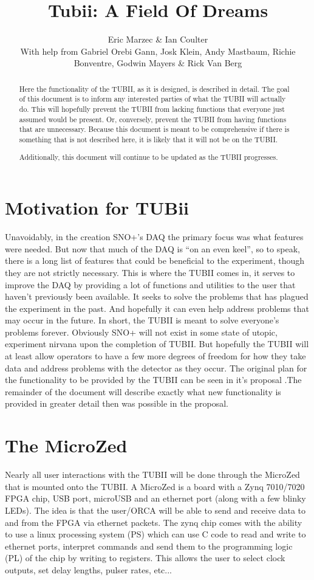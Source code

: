 \documentclass[11pt,a4paper]{article}
\title{Tubii: A Field Of Dreams}
\author{Eric Marzec \& Ian Coulter\\ With help from Gabriel Orebi Gann, Josk Klein, Andy Mastbaum, Richie Bonventre, Godwin Mayers \& Rick Van Berg}
\begin{document}
\maketitle
\begin{abstract}
Here the functionality of the TUBII, as it is designed, is described in detail. The goal of this document is to inform any interested parties of what the TUBII will actually do. This will hopefully prevent the TUBII from lacking functions that everyone just assumed would be present. Or, conversely, prevent the TUBII from having functions that are unnecessary. Because this document is meant to be comprehensive if there is something that is not described here, it is likely that it will not be on the TUBII. 

Additionally, this document will continue to be updated as the TUBII progresses.
\end{abstract}
\section{Motivation for TUBii}
Unavoidably, in the creation SNO+'s DAQ the primary focus was what features were needed. But now that much of the DAQ is ``on an even keel'', so to speak, there is a long list of features that could be beneficial to the experiment, though they are not strictly necessary. This is where the TUBII comes in, it serves to improve the DAQ by providing a lot of functions and utilities to the user that haven't previously been available. It seeks to solve the problems that has plagued the experiment in the past. And hopefully it can even help address problems that may occur in the future. In short, the TUBII is meant to solve everyone's problems forever. Obviously SNO+ will not exist in some state of utopic, experiment nirvana upon the completion of TUBII. But hopefully the TUBII will at least allow operators to have a few more degrees of freedom for how they take data and address problems with the detector as they occur. The original plan for the functionality to be provided by the TUBII can be seen in it's proposal \cite{TubiiPlanDocument}.The remainder of the document will describe exactly what new functionality is provided in greater detail then was possible in the proposal.


\section{The MicroZed}

Nearly all user interactions with the TUBII will be done through the MicroZed that is mounted onto the TUBII. A MicroZed is a board with a Zynq 7010/7020 FPGA chip, USB port, microUSB and an ethernet port (along with a few blinky LEDs). The idea is that the user/ORCA will be able to send and receive data to and from the FPGA via ethernet packets. The zynq chip comes with the ability to use a linux processing system (PS) which can use C code to read and write to ethernet ports, interpret commands and send them to the programming logic (PL) of the chip by writing to registers. This allows the user to select clock outputs, set delay lengths, pulser rates, etc...
\end{document}
